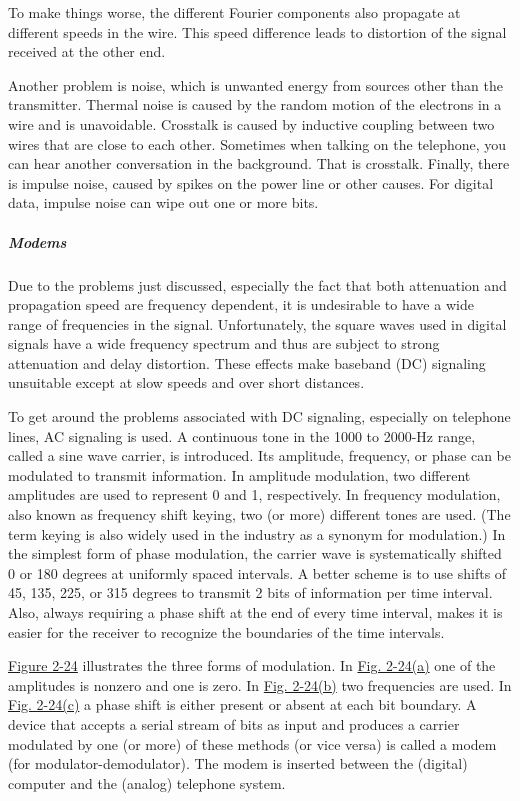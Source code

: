 To make things worse, the different Fourier components also propagate at
different speeds in the wire. This speed difference leads to
{distortion} of the signal received at the other end.

Another problem is {noise}, which is unwanted energy from sources other
than the transmitter. Thermal noise is caused by the random motion of
the electrons in a wire and is unavoidable. Crosstalk is caused by
inductive coupling between two wires that are close to each other.
Sometimes when talking on the telephone, you can hear another
conversation in the background. That is crosstalk. Finally, there is
impulse noise, caused by spikes on the power line or other causes. For
digital data, impulse noise can wipe out one or more bits.

\protect\hypertarget{0130661023_ch02lev1sec5.htmlux5cux23ch02lev3sec9}{}{}

\subparagraph{Modems}

Due to the problems just discussed, especially the fact that both
attenuation and propagation speed are frequency dependent, it is
undesirable to have a wide range of frequencies in the signal.
Unfortunately, the square waves used in digital signals have a wide
frequency spectrum and thus are subject to strong attenuation and delay
distortion. These effects make baseband (DC) signaling unsuitable except
at slow speeds and over short distances.

To get around the problems associated with DC signaling, especially on
telephone lines, AC signaling is used. A continuous tone in the 1000 to
2000-Hz range, called a {sine wave carrier}, is introduced. Its
amplitude, frequency, or phase can be modulated to transmit information.
In {amplitude modulation}, two different amplitudes are used to
represent 0 and 1, respectively. In {frequency modulation}, also known
as {frequency shift keying}, two (or more) different tones are used.
(The term {keying} is also widely used in the industry as a synonym for
modulation.) In the simplest form of {phase modulation}, the carrier
wave is systematically shifted 0 or 180 degrees at uniformly spaced
intervals. A better scheme is to use shifts of 45, 135, 225, or 315
degrees to transmit 2 bits of information per time interval. Also,
always requiring a phase shift at the end of every time interval, makes
it is easier for the receiver to recognize the boundaries of the time
intervals.

\protect\hyperlink{0130661023_ch02lev1sec5.htmlux5cux23ch02fig24}{Figure
2-24} illustrates the three forms of modulation. In
\protect\hyperlink{0130661023_ch02lev1sec5.htmlux5cux23ch02fig24}{Fig.
2-24(a)} one of the amplitudes is nonzero and one is zero. In
\protect\hyperlink{0130661023_ch02lev1sec5.htmlux5cux23ch02fig24}{Fig.
2-24(b)} two frequencies are used. In
\protect\hyperlink{0130661023_ch02lev1sec5.htmlux5cux23ch02fig24}{Fig.
2-24(c)} a phase shift is either present or absent at each bit boundary.
A device that accepts a serial stream of bits as input and produces a
carrier modulated by one (or more) of these methods (or vice versa) is
called a {modem} (for modulator-demodulator). The modem is inserted
between the (digital) computer and the (analog) telephone system.

